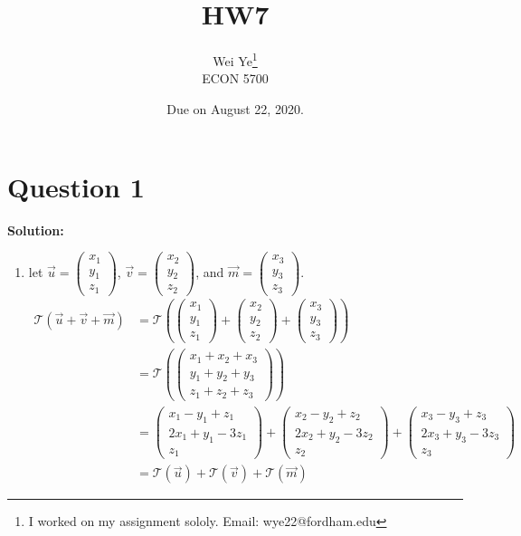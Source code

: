 \documentclass[11pt]{article} %
\title{HW7}
\author{Wei Ye\footnote{I worked on my assignment sololy. Email: wye22@fordham.edu}  	\\
	ECON 5700}
\date{Due on August 22, 2020.}
\begin{document}
	\maketitle
	\section{Question 1}
	\textbf{Solution:}

\begin{enumerate}
	\item 
	
	let 
$\vec{u}= \begin{pmatrix}
	x_1\\
	y_1\\
	z_1
\end{pmatrix}$, $\vec{v}=
\begin{pmatrix}
	x_2\\
	y_2\\
	z_2
\end{pmatrix}$, and $\vec{m}= \begin{pmatrix}
x_3\\
y_3\\
z_3
\end{pmatrix}$.
\begin{align*}
	\mathcal{T}(\vec{u}+\vec{v}+\vec{m})&=\mathcal{T}(\begin{pmatrix}
			x_1\\
		y_1\\
		z_1
	\end{pmatrix}+
\begin{pmatrix}
x_2\\
y_2\\
z_2
\end{pmatrix}+
\begin{pmatrix}
x_3\\
y_3\\
z_3
\end{pmatrix})\\
&=\mathcal{T}(\begin{pmatrix}
	x_1+x_2+x_3\\
	y_1+y_2+y_3\\
	z_1+z_2+z_3
\end{pmatrix})\\
&=\begin{pmatrix}
	x_1-y_1+z_1\\
	2x_1+y_1-3z_1\\
	z_1
\end{pmatrix}+
\begin{pmatrix}
	x_2-y_2+z_2\\
	2x_2+y_2-3z_2\\
	z_2
\end{pmatrix}+
\begin{pmatrix}
	x_3-y_3+z_3\\
	2x_3+y_3-3z_3\\
	z_3
\end{pmatrix}\\
&=\mathcal{T}(\vec{u})+\mathcal{T}(\vec{v})+\mathcal{T}(\vec{m})
\end{align*}


\end{enumerate}
\end{document}
